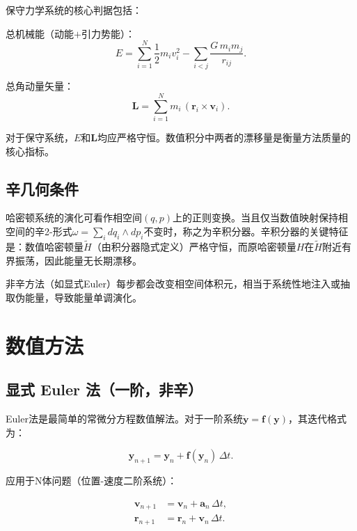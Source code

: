 \documentclass[twocolumn,10pt]{article}
\begin{document}
保守力学系统的核心判据包括：

总机械能（动能$+$引力势能）：
\begin{equation}
    E = \sum_{i=1}^{N} \frac{1}{2}m_i v_i^2
    - \sum_{i<j} \frac{G\,m_i m_j}{r_{ij}}.
    \label{eq:energy}
\end{equation}

总角动量矢量：
\begin{equation}
    \mathbf{L} = \sum_{i=1}^{N} m_i\,(\mathbf{r}_i \times \mathbf{v}_i).
    \label{eq:angmom}
\end{equation}

对于保守系统，$E$和$\mathbf{L}$均应严格守恒。数值积分中两者的漂移量是衡量方法质量的核心指标。

\subsection{辛几何条件}

哈密顿系统的演化可看作相空间$(q,p)$上的正则变换。当且仅当数值映射保持相空间的辛2-形式$\omega = \sum_i dq_i \wedge dp_i$不变时，称之为辛积分器\cite{hairer2006geometric}。辛积分器的关键特征是：数值哈密顿量$\tilde{H}$（由积分器隐式定义）严格守恒，而原哈密顿量$H$在$\tilde{H}$附近有界振荡，因此能量无长期漂移。

非辛方法（如显式Euler）每步都会改变相空间体积元，相当于系统性地注入或抽取伪能量，导致能量单调演化\cite{springel2005simulating}。

\section{数值方法}

\subsection{显式 Euler 法（一阶，非辛）}

Euler法是最简单的常微分方程数值解法。对于一阶系统$\dot{\mathbf{y}} = \mathbf{f}(\mathbf{y})$，其迭代格式为：

\begin{equation}
    \mathbf{y}_{n+1} = \mathbf{y}_n + \mathbf{f}(\mathbf{y}_n)\,\Delta t.
\end{equation}

应用于N体问题（位置-速度二阶系统）：

\begin{subequations}
\begin{align}
    \mathbf{v}_{n+1} &= \mathbf{v}_n + \mathbf{a}_n\,\Delta t, \label{eq:euler_v}\\
    \mathbf{r}_{n+1} &= \mathbf{r}_n + \mathbf{v}_n\,\Delta t. \label{eq:euler_r}
\end{align}
\end{subequations}
\end{document}
